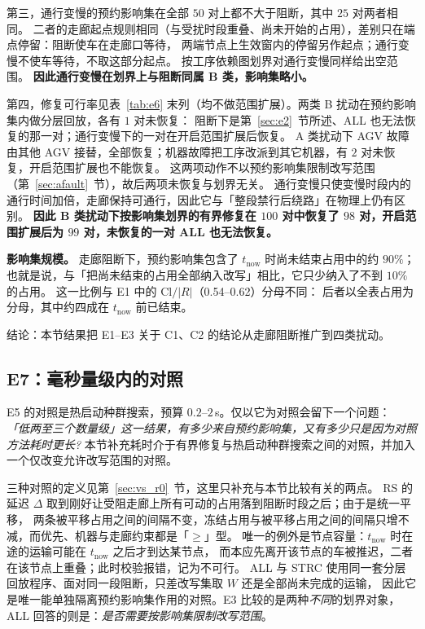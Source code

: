 \documentclass[manuscript,screen,review]{acmart}
\providecommand{\STRC}{\textsc{STRC}}
\newcommand{\EoneCloLo}{0.54}
\newcommand{\EoneCloHi}{0.62}
\newcommand{\ClosureAliveFrac}{90\%}
\begin{document}
第三，通行变慢的预约影响集在全部 \(50\) 对上都不大于阻断，其中 \(25\) 对两者相同。
二者的走廊起点规则相同（与受扰时段重叠、尚未开始的占用），差别只在端点停留：阻断使车在走廊口等待，
两端节点上生效窗内的停留另作起点；通行变慢不使车等待，不取这部分起点。
按工序依赖图划界对通行变慢同样给出空范围。
\textbf{因此通行变慢在划界上与阻断同属 B 类，影响集略小。}

第四，修复可行率见表~\ref{tab:e6} 末列（均不做范围扩展）。两类 B 扰动在预约影响集内做分层回放，各有 \(1\) 对未恢复：
阻断下是第~\ref{sec:e2}~节所述、ALL 也无法恢复的那一对；通行变慢下的一对在开启范围扩展后恢复。
A 类扰动下 AGV 故障由其他 AGV 接替，全部恢复；机器故障把工序改派到其它机器，有 \(2\) 对未恢复，开启范围扩展也不能恢复。
这两项动作不以预约影响集限制改写范围（第~\ref{sec:afault}~节），故后两项未恢复与划界无关。
通行变慢只使变慢时段内的通行时间加倍，走廊保持可通行，因此它与「整段禁行后绕路」在物理上仍有区别。
\textbf{因此 B 类扰动下按影响集划界的有界修复在 \(100\) 对中恢复了 \(98\) 对，开启范围扩展后为 \(99\) 对，未恢复的一对 ALL 也无法恢复。}

\textbf{影响集规模。} 走廊阻断下，预约影响集包含了 \(t_{\mathrm{now}}\) 时尚未结束占用中的约 \(\ClosureAliveFrac\)；
也就是说，与「把尚未结束的占用全部纳入改写」相比，它只少纳入了不到 \(10\%\) 的占用。
这一比例与 E1 中的 \(\mathrm{Cl}/|R|\)（\EoneCloLo--\EoneCloHi）分母不同：
后者以全表占用为分母，其中约四成在 \(t_{\mathrm{now}}\) 前已结束。

结论：本节结果把 E1--E3 关于 C1、C2 的结论从走廊阻断推广到四类扰动。

\subsection{E7：毫秒量级内的对照}
\label{sec:cheap}

E5 的对照是热启动种群搜索，预算 \(0.2\)--\(2\)\,s。仅以它为对照会留下一个问题：
\emph{「低两至三个数量级」这一结果，有多少来自预约影响集，又有多少只是因为对照方法耗时更长?}
本节补充耗时介于有界修复与热启动种群搜索之间的对照，并加入一个仅改变允许改写范围的对照。

三种对照的定义见第~\ref{sec:vs_r0}~节，这里只补充与本节比较有关的两点。
RS 的延迟 \(\Delta\) 取到刚好让受阻走廊上所有可动的占用落到阻断时段之后；由于是统一平移，
两条被平移占用之间的间隔不变，冻结占用与被平移占用之间的间隔只增不减，而优先、机器与走廊约束都是「\(\ge\)」型。
唯一的例外是节点容量：\(t_{\mathrm{now}}\) 时在途的运输可能在 \(t_{\mathrm{now}}\) 之后才到达某节点，
而本应先离开该节点的车被推迟，二者在该节点上重叠；此时校验报错，记为不可行。
ALL 与 \STRC{} 使用同一套分层回放程序、面对同一段阻断，只差改写集取 \(W\) 还是全部尚未完成的运输，
因此它是唯一能单独隔离预约影响集作用的对照。E3 比较的是两种\emph{不同}的划界对象，
ALL 回答的则是：\emph{是否需要按影响集限制改写范围}。
\end{document}
